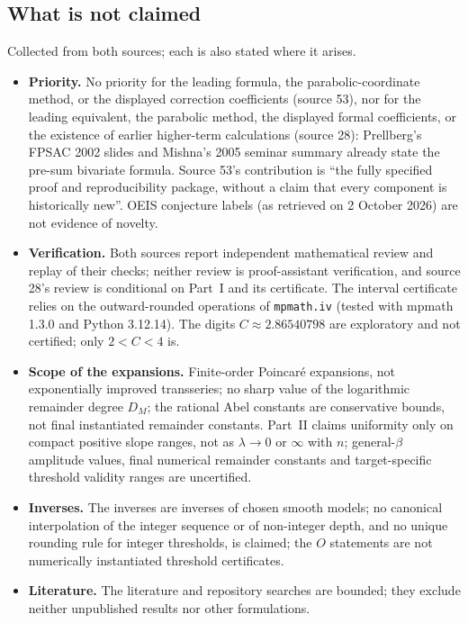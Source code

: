 \documentclass[11pt,letterpaper]{article}
\theoremstyle{remark}\newtheorem{remark}[theorem]{Remark}
\begin{document}
\subsection*{What is not claimed}
\label{ibd:guide:nonclaims}
Collected from both sources; each is also stated where it arises.
\begin{itemize}
\item \textbf{Priority.} No priority for the leading formula, the parabolic-coordinate method, or the displayed correction coefficients (source 53), nor for the leading equivalent, the parabolic method, the displayed formal coefficients, or the existence of earlier higher-term calculations (source 28): Prellberg's FPSAC 2002 slides and Mishna's 2005 seminar summary already state the pre-sum bivariate formula. Source 53's contribution is ``the fully specified proof and reproducibility package, without a claim that every component is historically new''. OEIS conjecture labels (as retrieved on 2 October 2026) are not evidence of novelty.
\item \textbf{Verification.} Both sources report independent mathematical review and replay of their checks; neither review is proof-assistant verification, and source 28's review is conditional on Part~I and its certificate. The interval certificate relies on the outward-rounded operations of \texttt{mpmath.iv} (tested with mpmath 1.3.0 and Python 3.12.14). The digits $C\approx2.86540798$ are exploratory and not certified; only $2<C<4$ is.
\item \textbf{Scope of the expansions.} Finite-order Poincar\'e expansions, not exponentially improved transseries; no sharp value of the logarithmic remainder degree $D_M$; the rational Abel constants are conservative bounds, not final instantiated remainder constants. Part~II claims uniformity only on compact positive slope ranges, not as $\lambda\to0$ or $\infty$ with $n$; general-$\beta$ amplitude values, final numerical remainder constants and target-specific threshold validity ranges are uncertified.
\item \textbf{Inverses.} The inverses are inverses of chosen smooth models; no canonical interpolation of the integer sequence or of non-integer depth, and no unique rounding rule for integer thresholds, is claimed; the $O$ statements are not numerically instantiated threshold certificates.
\item \textbf{Literature.} The literature and repository searches are bounded; they exclude neither unpublished results nor other formulations.
\end{itemize}
\end{document}
